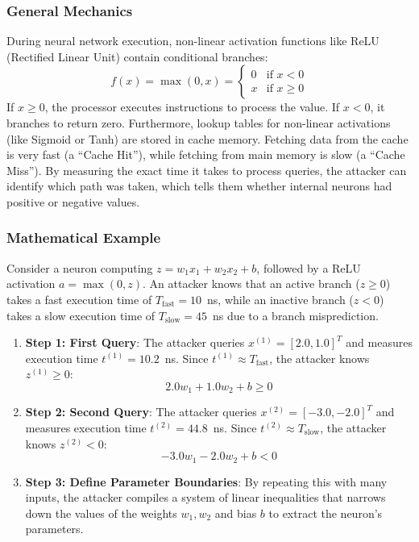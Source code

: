 \documentclass{article}
\begin{document}
\subsubsection{General Mechanics}
During neural network execution, non-linear activation functions like ReLU (Rectified Linear Unit) contain conditional branches:
\begin{equation}
    f(x) = \max(0, x) = 
    \begin{cases} 
        0 & \text{if } x < 0 \\ 
        x & \text{if } x \geq 0 
    \end{cases}
\end{equation}
If $x \geq 0$, the processor executes instructions to process the value. If $x < 0$, it branches to return zero. 
Furthermore, lookup tables for non-linear activations (like Sigmoid or Tanh) are stored in cache memory. Fetching data from the cache is very fast (a ``Cache Hit''), while fetching from main memory is slow (a ``Cache Miss''). By measuring the exact time it takes to process queries, the attacker can identify which path was taken, which tells them whether internal neurons had positive or negative values.

\subsubsection{Mathematical Example}
Consider a neuron computing $z = w_1 x_1 + w_2 x_2 + b$, followed by a ReLU activation $a = \max(0, z)$.
An attacker knows that an active branch ($z \geq 0$) takes a fast execution time of $T_{\text{fast}} = 10$~ns, while an inactive branch ($z < 0$) takes a slow execution time of $T_{\text{slow}} = 45$~ns due to a branch misprediction.
\begin{enumerate}
    \item \textbf{Step 1: First Query}: The attacker queries $x^{(1)} = [2.0, 1.0]^T$ and measures execution time $t^{(1)} = 10.2$~ns. Since $t^{(1)} \approx T_{\text{fast}}$, the attacker knows $z^{(1)} \geq 0$:
    $$2.0 w_1 + 1.0 w_2 + b \geq 0$$
    
    \item \textbf{Step 2: Second Query}: The attacker queries $x^{(2)} = [-3.0, -2.0]^T$ and measures execution time $t^{(2)} = 44.8$~ns. Since $t^{(2)} \approx T_{\text{slow}}$, the attacker knows $z^{(2)} < 0$:
    $$-3.0 w_1 - 2.0 w_2 + b < 0$$
    
    \item \textbf{Step 3: Define Parameter Boundaries}: By repeating this with many inputs, the attacker compiles a system of linear inequalities that narrows down the values of the weights $w_1, w_2$ and bias $b$ to extract the neuron's parameters.
\end{enumerate}
\end{document}
